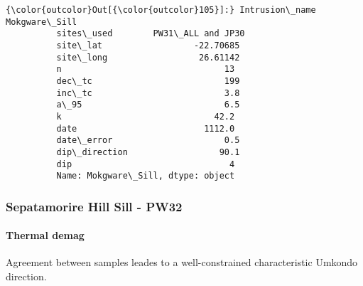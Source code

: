 \documentclass{article}
\begin{document}
            \begin{Verbatim}[commandchars=\\\{\}]
{\color{outcolor}Out[{\color{outcolor}105}]:} Intrusion\_name        Mokgware\_Sill
          sites\_used        PW31\_ALL and JP30
          site\_lat                  -22.70685
          site\_long                  26.61142
          n                                13
          dec\_tc                          199
          inc\_tc                          3.8
          a\_95                            6.5
          k                              42.2
          date                         1112.0
          date\_error                      0.5
          dip\_direction                  90.1
          dip                               4
          Name: Mokgware\_Sill, dtype: object
\end{Verbatim}
        
    \subsubsection{Sepatamorire Hill Sill -
PW32}\label{sepatamorire-hill-sill---pw32}

    \paragraph{Thermal demag}\label{thermal-demag}

    Agreement between samples leades to a well-constrained characteristic
Umkondo direction.
\end{document}
